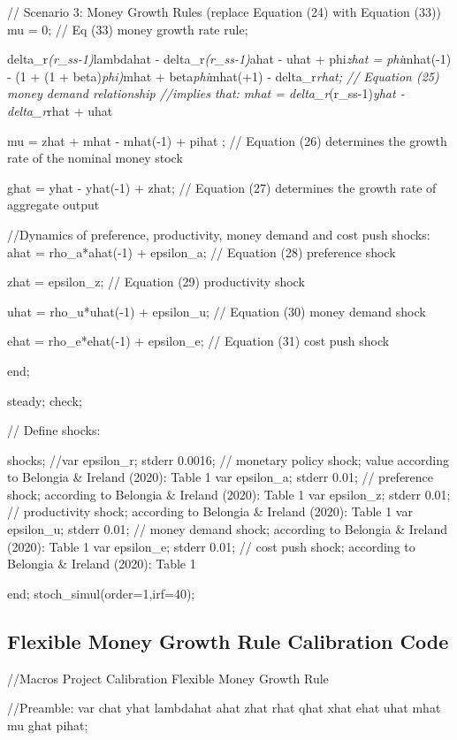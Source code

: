 \documentclass[11pt,preprint, authoryear]{elsarticle}
\numberwithin{equation}{section}
\numberwithin{figure}{section}
\numberwithin{table}{section}
\begin{document}
// Scenario 3: Money Growth Rules (replace Equation (24) with Equation
(33)) mu = 0; // Eq (33) money growth rate rule;

delta\_r\emph{(r\_ss-1)}lambdahat - delta\_r\emph{(r\_ss-1)}ahat - uhat
+ phi\emph{zhat = phi}mhat(-1) - (1 + (1 + beta)\emph{phi)}mhat +
beta\emph{phi}mhat(+1) - delta\_r\emph{rhat; // Equation (25) money
demand relationship //implies that: mhat = delta\_r}(r\_ss-1)\emph{yhat
- delta\_r}rhat + uhat

mu = zhat + mhat - mhat(-1) + pihat ; // Equation (26) determines the
growth rate of the nominal money stock

ghat = yhat - yhat(-1) + zhat; // Equation (27) determines the growth
rate of aggregate output

//Dynamics of preference, productivity, money demand and cost push
shocks: ahat = rho\_a*ahat(-1) + epsilon\_a; // Equation (28) preference
shock

zhat = epsilon\_z; // Equation (29) productivity shock

uhat = rho\_u*uhat(-1) + epsilon\_u; // Equation (30) money demand shock

ehat = rho\_e*ehat(-1) + epsilon\_e; // Equation (31) cost push shock

end;

steady; check;

// Define shocks:

shocks; //var epsilon\_r; stderr 0.0016; // monetary policy shock; value
according to Belongia \& Ireland (2020): Table 1 var epsilon\_a; stderr
0.01; // preference shock; according to Belongia \& Ireland (2020):
Table 1 var epsilon\_z; stderr 0.01; // productivity shock; according to
Belongia \& Ireland (2020): Table 1 var epsilon\_u; stderr 0.01; //
money demand shock; according to Belongia \& Ireland (2020): Table 1 var
epsilon\_e; stderr 0.01; // cost push shock; according to Belongia \&
Ireland (2020): Table 1

end; stoch\_simul(order=1,irf=40);

\hypertarget{flexible-money-growth-rule-calibration-code}{%
\subsection{Flexible Money Growth Rule Calibration
Code}\label{flexible-money-growth-rule-calibration-code}}

//Macros Project Calibration Flexible Money Growth Rule

//Preamble: var chat yhat lambdahat ahat zhat rhat qhat xhat ehat uhat
mhat mu ghat pihat;
\end{document}
